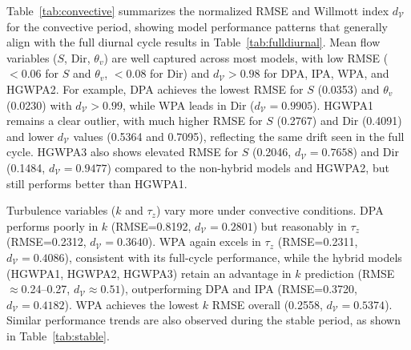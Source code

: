 Table~\ref{tab:convective} summarizes the normalized RMSE and Willmott index $d_\mathcal{V}$ for the convective period, showing model performance patterns that generally align with the full diurnal cycle results in Table~\ref{tab:fulldiurnal}. Mean flow variables ($S$, Dir, $\theta_v$) are well captured across most models, with low RMSE ($<0.06$ for $S$ and $\theta_v$, $<0.08$ for Dir) and $d_\mathcal{V} > 0.98$ for DPA, IPA, WPA, and HGWPA2. For example, DPA achieves the lowest RMSE for $S$ (0.0353) and $\theta_v$ (0.0230) with $d_\mathcal{V} > 0.99$, while WPA leads in Dir ($d_\mathcal{V}=0.9905$). HGWPA1 remains a clear outlier, with much higher RMSE for $S$ (0.2767) and Dir (0.4091) and lower $d_\mathcal{V}$ values (0.5364 and 0.7095), reflecting the same drift seen in the full cycle. HGWPA3 also shows elevated RMSE for $S$ (0.2046, $d_\mathcal{V}=0.7658$) and Dir (0.1484, $d_\mathcal{V}=0.9477$) compared to the non-hybrid models and HGWPA2, but still performs better than HGWPA1.

Turbulence variables ($k$ and $\tau_z$) vary more under convective conditions. DPA performs poorly in $k$ (RMSE=0.8192, $d_\mathcal{V}=0.2801$) but reasonably in $\tau_z$ (RMSE=0.2312, $d_\mathcal{V}=0.3640$). WPA again excels in $\tau_z$ (RMSE=0.2311, $d_\mathcal{V}=0.4086$), consistent with its full-cycle performance, while the hybrid models (HGWPA1, HGWPA2, HGWPA3) retain an advantage in $k$ prediction (RMSE $\approx$0.24–0.27, $d_\mathcal{V} \approx 0.51$), outperforming DPA and IPA (RMSE=0.3720, $d_\mathcal{V}=0.4182$). WPA achieves the lowest $k$ RMSE overall (0.2558, $d_\mathcal{V}=0.5374$). Similar performance trends are also observed during the stable period, as shown in Table~\ref{tab:stable}.


